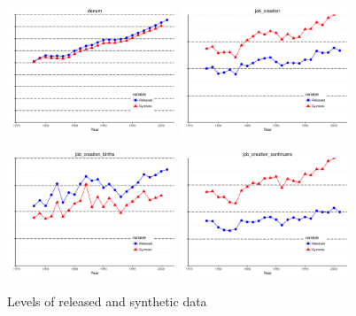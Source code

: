 \clearpage
\begin{figure}[p]
	\centering
	\caption{Levels of released and synthetic data\label{fig:level_denom}}
	\includegraphics[width=0.45\textwidth]{results/graph_bds_real_vs_syn_denom_R}
	\includegraphics[width=0.45\textwidth]{results/graph_bds_real_vs_syn_job_creation_R}
	
	\includegraphics[width=0.45\textwidth]{results/graph_bds_real_vs_syn_job_creation_births_R}
	\includegraphics[width=0.45\textwidth]{results/graph_bds_real_vs_syn_job_creation_continuers_R}
\end{figure}

